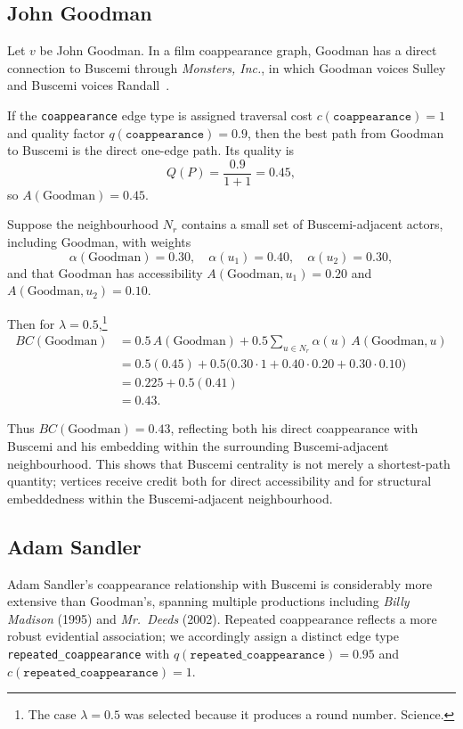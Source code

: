 \documentclass[11pt]{article}
\begin{document}
\subsection{John Goodman}

Let $v$ be John Goodman. In a film coappearance graph, Goodman has a direct connection to Buscemi through \emph{Monsters, Inc.}, in which Goodman voices Sulley and Buscemi voices Randall~\cite{monsters_inc_imdb}.

If the \texttt{coappearance} edge type is assigned traversal cost $c(\texttt{coappearance})=1$ and quality factor $q(\texttt{coappearance})=0.9$, then the best path from Goodman to Buscemi is the direct one-edge path. Its quality is
\[
Q(P)=\frac{0.9}{1+1}=0.45,
\]
so $A(\text{Goodman}) = 0.45$.

Suppose the neighbourhood $N_r$ contains a small set of Buscemi-adjacent actors, including Goodman, with weights
\[
\alpha(\text{Goodman})=0.30,\quad
\alpha(u_1)=0.40,\quad
\alpha(u_2)=0.30,
\]
and that Goodman has accessibility $A(\text{Goodman},u_1)=0.20$ and $A(\text{Goodman},u_2)=0.10$.

Then for $\lambda=0.5$,\footnote{The case $\lambda = 0.5$ was selected because it produces a round number. Science.}
\[
\begin{aligned}
BC(\text{Goodman})
&= 0.5\,A(\text{Goodman})
 + 0.5 \sum_{u \in N_r} \alpha(u)\,A(\text{Goodman},u) \\
&= 0.5(0.45) + 0.5\bigl(0.30\cdot 1 + 0.40\cdot 0.20 + 0.30\cdot 0.10\bigr) \\
&= 0.225 + 0.5(0.41) \\
&= 0.43.
\end{aligned}
\]

Thus $BC(\text{Goodman}) = 0.43$, reflecting both his direct coappearance with Buscemi and his embedding within the surrounding Buscemi-adjacent neighbourhood. This shows that Buscemi centrality is not merely a shortest-path quantity; vertices receive credit both for direct accessibility and for structural embeddedness within the Buscemi-adjacent neighbourhood.

\subsection{Adam Sandler}

Adam Sandler's coappearance relationship with Buscemi is considerably more extensive than Goodman's, spanning multiple productions including \emph{Billy Madison} (1995) and \emph{Mr.\ Deeds} (2002). Repeated coappearance reflects a more robust evidential association; we accordingly assign a distinct edge type \texttt{repeated\_coappearance} with $q(\texttt{repeated\_coappearance}) = 0.95$ and $c(\texttt{repeated\_coappearance}) = 1$.
\end{document}
